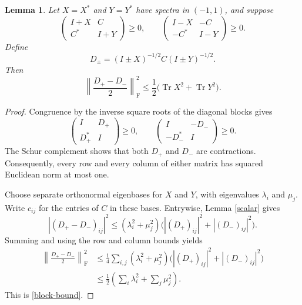 \documentclass[11pt]{article}
\newcommand{\Tr}{\operatorname{Tr}}
\newcommand{\norm}[1]{\left\|#1\right\|_{\mathrm F}}
\newtheorem{lemma}{Lemma}
\begin{document}
\begin{lemma}\label{block}
Let $X=X^*$ and $Y=Y^*$ have spectra in $(-1,1)$, and suppose
\[
 \begin{pmatrix}I+X&C\\ C^*&I+Y\end{pmatrix}\geq0,\qquad
 \begin{pmatrix}I-X&-C\\ -C^*&I-Y\end{pmatrix}\geq0.
\]
Define
\[
 D_\pm=(I\pm X)^{-1/2}C(I\pm Y)^{-1/2}.
\]
Then
\begin{equation}\label{block-bound}
 \norm{\frac{D_+-D_-}{2}}^2
 \leq\frac12\bigl(\Tr X^2+\Tr Y^2\bigr).
\end{equation}
\end{lemma}
\begin{proof}
Congruence by the inverse square roots of the diagonal blocks gives
\[
 \begin{pmatrix}I&D_+\\D_+^*&I\end{pmatrix}\geq0,\qquad
 \begin{pmatrix}I&-D_-\\-D_-^*&I\end{pmatrix}\geq0.
\]
The Schur complement shows that both $D_+$ and $D_-$ are contractions.
Consequently, every row and every column of either matrix has squared
Euclidean norm at most one.

Choose separate orthonormal eigenbases for $X$ and $Y$, with eigenvalues
$\lambda_i$ and $\mu_j$. Write $c_{ij}$ for the entries of $C$ in these
bases. Entrywise, Lemma \ref{scalar} gives
\[
 |(D_+-D_-)_{ij}|^2
 \leq(\lambda_i^2+\mu_j^2)
       \bigl(|(D_+)_{ij}|^2+|(D_-)_{ij}|^2\bigr).
\]
Summing and using the row and column bounds yields
\[
\begin{aligned}
 \norm{\frac{D_+-D_-}{2}}^2
 &\leq\frac14\sum_{i,j}(\lambda_i^2+\mu_j^2)
       \bigl(|(D_+)_{ij}|^2+|(D_-)_{ij}|^2\bigr)\\
 &\leq\frac12\left(\sum_i\lambda_i^2+\sum_j\mu_j^2\right).
\end{aligned}
\]
This is \eqref{block-bound}.
\end{proof}
\end{document}
